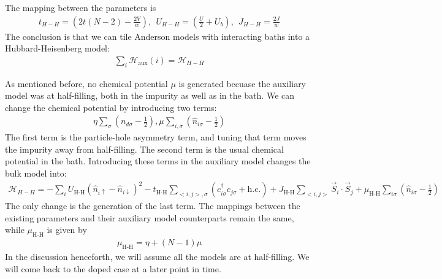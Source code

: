 \documentclass[10pt]{report}
\numberwithin{equation}{section}
\begin{document}
The mapping between the parameters is
\begin{equation}\begin{aligned}
	\label{map_aux_bulk}
	t_{H-H} = \left(2t (N-2) - \frac{2V}{w}\right),~ ~ U_{H-H} = \left(\frac{U}{2} + U_b\right), ~ ~ J_{H-H} = \frac{2J}{w}
\end{aligned}\end{equation}
The conclusion is that we can tile Anderson models with interacting baths into a Hubbard-Heisenberg model:
\begin{equation}\begin{aligned}
	\label{siam_to_hubb}
	\sum_i \mathcal{H}_\text{aux}(i) = \mathcal{H}_{H-H}
\end{aligned}\end{equation}

As mentioned before, no chemical potential \(\mu\) is generated becuase the auxiliary model was at half-filling, both in the impurity as well as in the bath. We can change the chemical potential by introducing two terms:
\begin{equation}\begin{aligned}
	\eta \sum_\sigma\left(n_{d\sigma} - \frac{1}{2}\right), \mu \sum_{i,\sigma}\left(\hat n_{i\sigma} - \frac{1}{2}\right)
\end{aligned}\end{equation}
The first term is the particle-hole asymmetry term, and tuning that term moves the impurity away from half-filling. The second term is the usual chemical potential in the bath. Introducing these terms in the auxiliary model changes the bulk model into:
\begin{equation}\begin{aligned}
	\mathcal{H}_{H-H} = -\sum_{i} U_\text{H-H} \left(\hat n_{i \uparrow} - \hat n_{i \downarrow} \right)^2 - t_\text{H-H}\sum_{<i,j>,\sigma}\left(c^\dagger_{i\sigma}c_{j\sigma} + \text{h.c.}\right) + J_\text{H-H}\sum_{<i,j>} \vec{S}_i\cdot\vec{S}_j + \mu_\text{H-H}\sum_{i\sigma}\left(\hat n_{i\sigma} - \frac{1}{2}\right) 
\end{aligned}\end{equation}
The only change is the generation of the last term. The mappings between the existing parameters and their auxiliary model counterparts remain the same, while \(\mu_\text{H-H}\) is given by
\begin{equation}\begin{aligned}
	\mu_\text{H-H} = \eta + \left(N-1\right) \mu
\end{aligned}\end{equation}
In the discussion henceforth, we will assume all the models are at half-filling. We will come back to the doped case at a later point in time.
\end{document}
